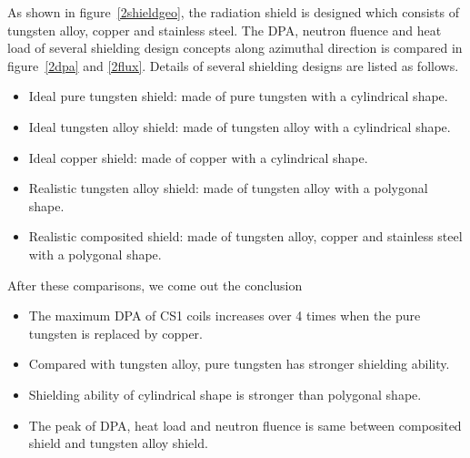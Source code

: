 As shown in figure~\ref{2shieldgeo}, the radiation shield is designed which consists of tungsten alloy, copper and stainless steel.
The DPA, neutron fluence and heat load of several shielding design concepts along azimuthal direction is compared in figure~\ref{2dpa} and \ref{2flux}.
Details of several shielding designs are listed as follows.
\begin{itemize}
 \setlength{\itemsep}{-7pt}
 \item Ideal pure tungsten shield: made of pure tungsten with a cylindrical shape.
 \item Ideal tungsten alloy shield: made of tungsten alloy with a cylindrical shape.
 \item Ideal copper shield: made of copper with a cylindrical shape.
 \item Realistic tungsten alloy shield: made of tungsten alloy with a polygonal shape.
 \item Realistic composited shield: made of tungsten alloy, copper and stainless steel with a polygonal shape.
\end{itemize}
After these comparisons, we come out the conclusion
\begin{itemize}
 \setlength{\itemsep}{-7pt}
 \item The maximum DPA of CS1 coils increases over 4 times when the pure tungsten is replaced by copper.
 \item Compared with tungsten alloy, pure tungsten has stronger shielding ability.
 \item Shielding ability of cylindrical shape is stronger than polygonal shape.
 \item The peak of DPA, heat load and neutron fluence is same between composited shield and tungsten alloy shield.
\end{itemize}
